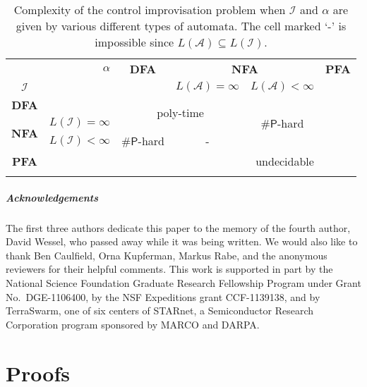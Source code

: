 \documentclass[a4paper,USenglish,numberwithinsect]{lipics}
\theoremstyle{plain}
\theoremstyle{definition}
\newcommand{\sharpP}{\ensuremath{\mathsf{\# P}}}
\newcommand{\improvs}{I}
\newcommand{\valids}{A}
\begin{document}
\setlength{\tabcolsep}{5pt}
\renewcommand{\arraystretch}{1.2}
\begin{table}[tb]
\begin{center}
\begin{tabular}{cr||c|c|c|c|}
 & $\alpha$ & \textbf{DFA} & \multicolumn{2}{|c|}{\textbf{NFA}} & \textbf{PFA} \\
$\mathcal{\improvs}$ &  &  & $L(\mathcal{\valids}) = \infty$ & $L(\mathcal{\valids}) < \infty$ &  \\
\hline
\hline
\textbf{DFA} &  & \multicolumn{2}{c|}{\multirow{2}{*}{poly-time}} & \multirow{3}{*}{\sharpP-hard} & \multirow{4}{*}{} \\
\cline{1-2}
\multirow{2}{*}{\textbf{NFA}} & $L(\mathcal{\improvs}) = \infty$ & \multicolumn{2}{c|}{} & &  \\
\cline{2-4}
& $L(\mathcal{\improvs}) < \infty$ & \sharpP-hard & - &   &  \\
\cline{1-5}
\textbf{PFA} &  & \multicolumn{4}{r|}{undecidable} \\
\hline \\
\end{tabular}
\caption{Complexity of the control improvisation problem when $\mathcal{\improvs}$ and $\alpha$ are given by various different types of automata. The cell marked `-' is impossible since $L(\mathcal{\valids}) \subseteq L(\mathcal{\improvs})$.}
\label{table:complexities}
\end{center}
\label{defaulttable}
\end{table}

\subparagraph*{Acknowledgements}
The first three authors dedicate this paper to the memory of the fourth author, David Wessel, who passed away while it was being written.
We would also like to thank Ben Caulfield, Orna Kupferman, Markus Rabe, and the anonymous reviewers for their helpful comments.
This work is supported in part by the National Science Foundation Graduate Research Fellowship Program 
under Grant No.~DGE-1106400, by the NSF Expeditions grant CCF-1139138, and 
by TerraSwarm, one of six centers of STARnet, a Semiconductor Research Corporation program sponsored by MARCO and DARPA.




\appendix

\section{Proofs}
\end{document}
